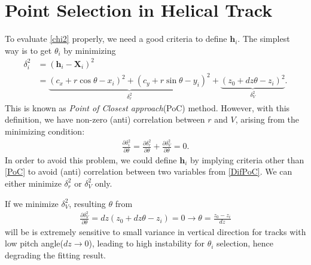 \documentclass{article}
\begin{document}
	\section{Point Selection in Helical Track}
	To evaluate \eqref{chi2} properly, we need a good criteria to define $\mathbf{h}_i$. The simplest way is to get $\theta_i$ by minimizing
	\begin{align}
		\delta_i^2 &= (\mathbf h_i - \mathbf X_i)^2 \nonumber \\
		&=\underbrace{(c_x+r \cos\theta - x_i)^2+(c_y+r \sin\theta - y_i)^2}_{\delta_r^2} + \underbrace{(z_0 + dz\theta -z_i)^2}_{\delta_V^2}.\label{PoC}
	\end{align}
	This is known as \textit{Point of Closest approach}(PoC) method. However, with this definition, we have non-zero (anti) correlation between $r$ and $V$, arising from the minimizing condition:
	\begin{align}
		\frac{\partial \delta_i^2}{\partial \theta} = \frac{\partial \delta_r^2}{\partial \theta}+\frac{\partial \delta_V^2}{\partial \theta} = 0.\label{DifPoC}
	\end{align}
	In order to avoid this problem, we could define $\mathbf h_i$ by implying criteria other than \eqref{PoC} to avoid (anti) correlation between two variables from \eqref{DifPoC}. We can either minimize $\delta_r^2$ or $\delta_V^2$ only.
	
	If we minimize $\delta_V^2$, resulting $\theta$ from
	\begin{align}
		\frac{\partial \delta_V^2}{\partial \theta} = dz (z_0+dz\theta-z_i)=0\to \theta = \frac{z_0-z_i}{dz}\label{dV}
	\end{align}
	will be is extremely sensitive to small variance in vertical direction for tracks with low pitch angle($dz\to 0$), leading to high instability for $\theta_i$ selection, hence degrading the fitting result.
\end{document}
